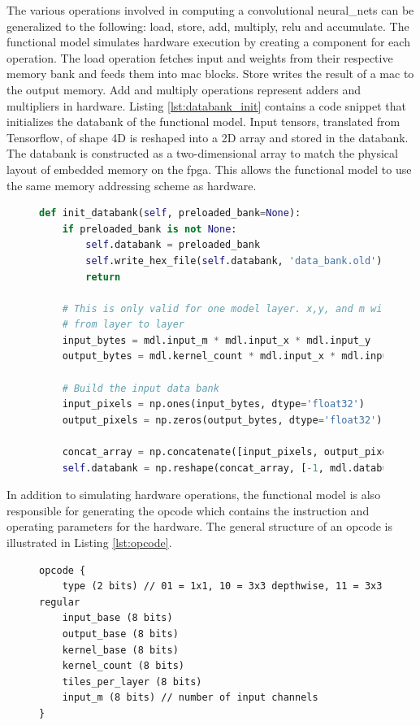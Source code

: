 \documentclass{uw-ece-wkrpt}
\begin{document}
The various operations involved in computing a convolutional \glspl{neural_net} can be generalized to the following: load, store, add, multiply, \gls{relu} and accumulate. The functional model simulates hardware execution by creating a component for each operation. The load operation fetches input and weights from their respective memory bank and feeds them into \gls{mac} blocks. Store writes the result of a \gls{mac} to the output memory. Add and multiply operations represent adders and multipliers in hardware. Listing \ref{lst:databank_init} contains a code snippet that initializes the databank of the functional model. Input \glspl{tensor}, translated from Tensorflow, of shape 4D is reshaped into a 2D array and stored in the databank. The databank is constructed as a two-dimensional array to match the physical layout of embedded memory on the \gls{fpga}. This allows the functional model to use the same memory addressing scheme as hardware.

\begin{figure}
\centering
\begin{lstlisting}[caption={Databank initialization in software}, label=lst:databank_init, language=Python]
def init_databank(self, preloaded_bank=None):
    if preloaded_bank is not None:
        self.databank = preloaded_bank
        self.write_hex_file(self.databank, 'data_bank.old')
        return

    # This is only valid for one model layer. x,y, and m will change
    # from layer to layer
    input_bytes = mdl.input_m * mdl.input_x * mdl.input_y
    output_bytes = mdl.kernel_count * mdl.input_x * mdl.input_y

    # Build the input data bank
    input_pixels = np.ones(input_bytes, dtype='float32')
    output_pixels = np.zeros(output_bytes, dtype='float32')

    concat_array = np.concatenate([input_pixels, output_pixels])
    self.databank = np.reshape(concat_array, [-1, mdl.databus_size])
\end{lstlisting}
\end{figure}

In addition to simulating hardware operations, the functional model is also responsible for generating the opcode which contains the instruction and operating parameters for the hardware. The general structure of an opcode is illustrated in Listing \ref{lst:opcode}.

\begin{figure}
\centering
\begin{lstlisting}[caption={General opcode format}, label=lst:opcode]
opcode {
    type (2 bits) // 01 = 1x1, 10 = 3x3 depthwise, 11 = 3x3 regular
    input_base (8 bits)
    output_base (8 bits)
    kernel_base (8 bits)
    kernel_count (8 bits)
    tiles_per_layer (8 bits)
    input_m (8 bits) // number of input channels
}
\end{lstlisting}
\end{figure}
\end{document}
